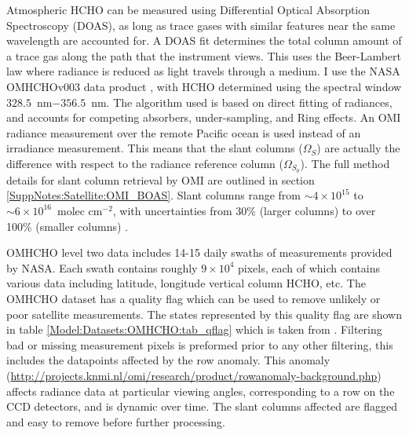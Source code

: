       Atmospheric HCHO can be measured using Differential Optical Absorption Spectroscopy (DOAS), as long as trace gases with similar features near the same wavelength are accounted for.
      A DOAS fit determines the total column amount of a trace gas along the path that the instrument views.
      This uses the Beer-Lambert law where radiance is reduced as light travels through a medium.
      I use the NASA OMHCHOv003 data product \parencite{Abad2015}, with HCHO determined using the spectral window $328.5$~nm$ - 356.5$~nm. 
      The algorithm used is based on direct fitting of radiances, and accounts for competing absorbers, under-sampling, and Ring effects.
      An OMI radiance measurement over the remote Pacific ocean is used instead of an irradiance measurement.
      This means that the slant columns ($\Omega_S$) are actually the difference with respect to the radiance reference column ($\Omega_{S_0}$).
      The full method details for slant column retrieval by OMI are outlined in section \ref{SuppNotes:Satellite:OMI_BOAS}.
      Slant columns range from $\sim 4\times 10^{15} $ to $\sim 6 \times 10^{16}$~molec cm$^{-2}$, with uncertainties from 30\% (larger columns) to over 100\% (smaller columns) \parencite{Abad2015}.
      
      
      OMHCHO level two data includes 14-15 daily swaths of measurements provided by NASA.
      Each swath contains roughly $9 \times 10^4$ pixels, each of which contains various data including latitude, longitude vertical column HCHO, etc.
      The OMHCHO dataset has a quality flag which can be used to remove unlikely or poor satellite measurements.
      The states represented by this quality flag are shown in table \ref{Model:Datasets:OMHCHO:tab_qflag} which is taken from \textcite{Kurosu2014}.
      Filtering bad or missing measurement pixels is preformed prior to any other filtering, this includes the datapoints affected by the row anomaly.
      This anomaly (\url{http://projects.knmi.nl/omi/research/product/rowanomaly-background.php}) affects radiance data at particular viewing angles, corresponding to a row on the CCD detectors, and is dynamic over time.
      The slant columns affected are flagged and easy to remove before further processing.
      

